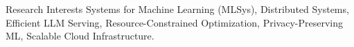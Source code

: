 
\begin{rSection}{Research Interests}
    Systems for Machine Learning (MLSys), Distributed Systems, Efficient LLM Serving, Resource-Constrained Optimization, Privacy-Preserving ML, Scalable Cloud Infrastructure.
\end{rSection}
